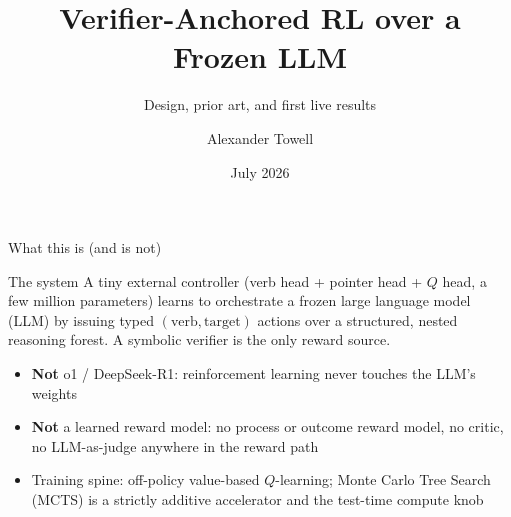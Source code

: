 \documentclass[aspectratio=169]{beamer}
\title{Verifier-Anchored RL over a Frozen LLM}
\subtitle{Design, prior art, and first live results}
\date{July 2026}
\author{Alexander Towell}
\begin{document}
\maketitle

\begin{frame}{What this is (and is not)}
  \begin{block}{The system}
    A \alert{tiny external controller} (verb head + pointer head + $Q$ head,
    a few million parameters) learns to orchestrate a \alert{frozen} large
    language model (LLM) by issuing typed $(\text{verb}, \text{target})$
    actions over a structured, nested reasoning forest. A \alert{symbolic
    verifier} is the only reward source.
  \end{block}
  \begin{itemize}
    \item \textbf{Not} o1 / DeepSeek-R1: reinforcement learning never
          touches the LLM's weights
    \item \textbf{Not} a learned reward model: no process or outcome reward
          model, no critic, no LLM-as-judge anywhere in the reward path
    \item Training spine: off-policy value-based $Q$-learning; Monte Carlo
          Tree Search (MCTS) is a strictly additive accelerator and the
          test-time compute knob
  \end{itemize}
\end{frame}
\end{document}
